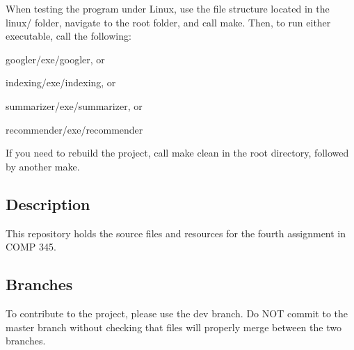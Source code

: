 When testing the program under Linux, use the file structure located in the {\ttfamily linux/} folder, navigate to the root folder, and call {\ttfamily make}. Then, to run either executable, call the following\+:


\begin{DoxyItemize}
\item {\ttfamily googler/exe/googler}, or
\item {\ttfamily indexing/exe/indexing}, or
\item {\ttfamily summarizer/exe/summarizer}, or
\item {\ttfamily recommender/exe/recommender}
\end{DoxyItemize}

If you need to rebuild the project, call {\ttfamily make clean} in the root directory, followed by another {\ttfamily make}.

\subsection*{Description}

This repository holds the source files and resources for the fourth assignment in C\+O\+MP 345.

\subsection*{Branches}

To contribute to the project, please use the {\ttfamily dev} branch. Do N\+OT commit to the {\ttfamily master} branch without checking that files will properly merge between the two branches. 